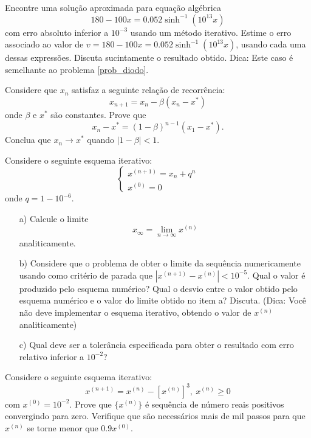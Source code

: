 \begin{Exercise} Encontre uma solução aproximada para equação algébrica
$$180-100x=0.052\sinh^{-1}(10^{13}x)$$
com erro absoluto inferior a $10^{-3}$ usando um método iterativo.
Estime o erro associado ao valor de $v=180-100x=0.052\sinh^{-1}(10^{13}x)$, usando cada uma dessas expressões. Discuta sucintamente o resultado obtido. Dica: Este caso é semelhante ao problema \ref{prob_diodo}.
\end{Exercise}

\begin{Exercise}Considere que $x_n$ satisfaz a seguinte relação de recorrência:
$$x_{n+1}=x_n - \beta \left(x_n-x^*\right)$$
onde $\beta$ e $x^*$ são constantes.
Prove que $$x_n-x^*=(1-\beta)^{n-1}(x_1-x^*).$$
Conclua que $x_n\to x^*$ quando $|1-\beta|<1$.
\end{Exercise}

\begin{Exercise}[title=Convergência lenta] Considere o seguinte esquema iterativo:
$$
\left\{\begin{array}{l}
x^{(n+1)}=x_n+q^n\\
x^{(0)}=0
\end{array}
\right.$$
onde $q=1-10^{-6}$.
\begin{itemize}
\item[a)] Calcule o limite $$x_\infty=\lim_{n\to\infty}x^{(n)}$$ analiticamente.
\item[b)] Considere que o problema de obter o limite da sequência numericamente usando como critério de parada que $|x^{(n+1)}-x^{(n)}|<10^{-5}$. Qual o valor é produzido pelo esquema numérico? Qual o desvio entre o valor obtido pelo esquema numérico e o valor do limite obtido no item a?  Discuta. (Dica: Você não deve implementar o esquema iterativo, obtendo o valor de $x^{(n)}$ analiticamente)
\item[c)] Qual deve ser a tolerância especificada para obter o resultado com erro relativo inferior a $10^{-2}$?
\end{itemize}
\end{Exercise}

\begin{Exercise}[title=Convergência sublinear] Considere o seguinte esquema iterativo:
$$x^{(n+1)}=x^{(n)}-[x^{(n)}]^3,\ x^{(n)}\geq 0$$
com $x^{(0)}= 10^{-2}$.
Prove que $\{x^{(n)}\}$ é sequência de número reais positivos convergindo para zero. Verifique que são necessários mais de mil passos para que $x^{(n)}$ se torne menor que $0.9 x^{(0)}$.
\end{Exercise}


